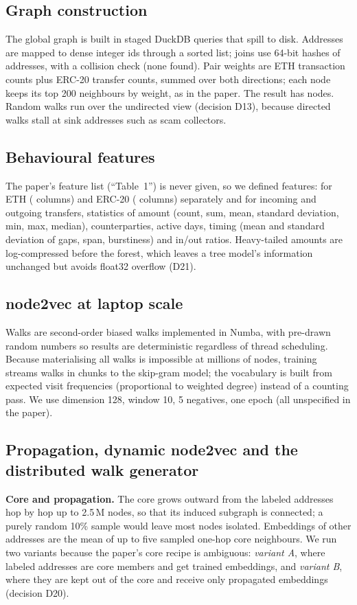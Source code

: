 \documentclass[11pt,a4paper]{article}
\begin{document}
\subsection{Graph construction}
The global graph is built in staged DuckDB queries that spill to disk. Addresses are mapped to dense integer ids through a sorted list; joins use 64-bit hashes of addresses, with a collision check (none found). Pair weights are ETH transaction counts plus ERC-20 transfer counts, summed over both directions; each node keeps its top 200 neighbours by weight, as in the paper. The result has \NumNodes{} nodes. Random walks run over the undirected view (decision D13), because directed walks stall at sink addresses such as scam collectors.

\subsection{Behavioural features}
The paper's feature list (``Table~1'') is never given, so we defined \NumFeat{} features: for ETH (\NumFeatEth{} columns) and ERC-20 (\NumFeatErc{} columns) separately and for incoming and outgoing transfers, statistics of amount (count, sum, mean, standard deviation, min, max, median), counterparties, active days, timing (mean and standard deviation of gaps, span, burstiness) and in/out ratios. Heavy-tailed amounts are log-compressed before the forest, which leaves a tree model's information unchanged but avoids float32 overflow (D21).

\subsection{node2vec at laptop scale}
Walks are second-order biased walks implemented in Numba, with pre-drawn random numbers so results are deterministic regardless of thread scheduling. Because materialising all walks is impossible at millions of nodes, training streams walks in chunks to the skip-gram model; the vocabulary is built from expected visit frequencies (proportional to weighted degree) instead of a counting pass. We use dimension 128, window 10, 5 negatives, one epoch (all unspecified in the paper).

\subsection{Propagation, dynamic node2vec and the distributed walk generator}
\textbf{Core and propagation.} The core grows outward from the labeled addresses hop by hop up to 2.5\,M nodes, so that its induced subgraph is connected; a purely random 10\% sample would leave most nodes isolated. Embeddings of other addresses are the mean of up to five sampled one-hop core neighbours. We run two variants because the paper's core recipe is ambiguous: \emph{variant A}, where labeled addresses are core members and get trained embeddings, and \emph{variant B}, where they are kept out of the core and receive only propagated embeddings (decision D20).
\end{document}
